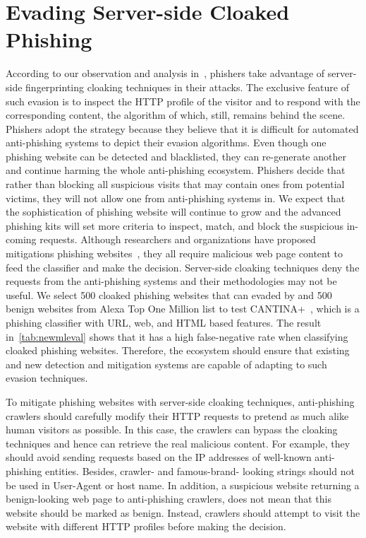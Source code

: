 \section{Evading Server-side Cloaked Phishing}

According to our observation and analysis in~, phishers take advantage of server-side fingerprinting cloaking techniques in their attacks.
The exclusive feature of such evasion is to inspect the HTTP profile of the visitor and to respond with the corresponding content,
the algorithm of which, still, remains behind the scene.
Phishers adopt the strategy because they believe that it is difficult for automated anti-phishing systems to depict their evasion algorithms.
Even though one phishing website can be detected and blacklisted, they can re-generate another and continue harming the whole anti-phishing ecosystem.
Phishers decide that rather than blocking all suspicious visits that may contain ones from potential victims, they will not allow one from anti-phishing systems in.
We expect that the sophistication of phishing website will continue to grow and the advanced phishing kits will set more criteria to inspect, match, and block the suspicious in-coming requests.
Although researchers and organizations have proposed mitigations phishing websites~\cite{xiang2011cantina+, lin2021phishpedia}, they all require malicious web page content to feed the classifier and make the decision.
Server-side cloaking techniques deny the requests from the anti-phishing systems and their methodologies may not be useful.
We select 500 cloaked phishing websites that can evaded by \spartacus and 500 benign websites from Alexa Top One Million list to test CANTINA+~\cite{xiang2011cantina+}, which is a phishing classifier with URL, web, and HTML based features.
The result in~\autoref{tab:newmleval} shows that it has a high false-negative rate when classifying cloaked phishing websites.
Therefore, the ecosystem should ensure
that existing and new detection and mitigation systems are capable of adapting to such evasion techniques.

\newmleval

To mitigate phishing websites with server-side cloaking techniques, anti-phishing crawlers should carefully modify their HTTP requests to pretend as much alike human visitors as possible.
In this case, the crawlers can bypass the cloaking techniques and hence can retrieve the real malicious content.
For example, they should avoid sending requests based on the IP addresses of well-known anti-phishing entities.
Besides, crawler- and famous-brand- looking strings should not be used in User-Agent or host name.
In addition, a suspicious website returning a benign-looking web page to anti-phishing crawlers, does not mean that this website should be marked as benign.
Instead, crawlers should attempt to visit the website with different HTTP profiles before making the decision.

